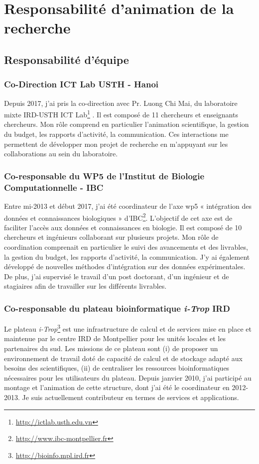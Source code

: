 \section{Responsabilité d'animation de la recherche}

\subsection*{Responsabilité d’équipe}
\subsubsection*{Co-Direction ICT Lab USTH - Hanoi} 
Depuis 2017, j’ai pris la co-direction avec Pr. Luong Chi Mai, du laboratoire mixte IRD-USTH ICT Lab\footnote{\url{http://ictlab.usth.edu.vn}} . Il est composé de 11 chercheurs et enseignants chercheurs. Mon rôle comprend en particulier l’animation scientifique, la gestion du budget, les rapports d’activité, la communication. Ces interactions me permettent de développer mon projet de recherche en m'appuyant sur les collaborations au sein du laboratoire.

\subsubsection*{Co-responsable du WP5 de l’Institut de Biologie Computationnelle - IBC} 
Entre mi-2013 et début 2017, j’ai été coordinateur de l’axe wp5 « intégration des données et connaissances biologiques » d'IBC\footnote{\url{http://www.ibc-montpellier.fr}}. L’objectif de cet axe est de faciliter l’accès aux données et connaissances en biologie. Il est composé de 10 chercheurs et ingénieurs collaborant sur plusieurs projets. Mon rôle de coordination comprenait en particulier le suivi des avancements et des livrables, la gestion du budget, les rapports d’activité, la communication. J’y ai également développé de nouvelles méthodes d’intégration sur des données expérimentales. De plus, j’ai supervisé le travail d’un post doctorant, d’un ingénieur et de stagiaires afin de travailler sur les différents livrables.  


\subsubsection*{Co-responsable du plateau bioinformatique \textit{i-Trop} IRD} 
Le plateau  \textit{i-Trop}\footnote{\url{http://bioinfo.mpl.ird.fr}} est une infrastructure de calcul et de services mise en place et maintenue par le centre IRD de Montpellier pour les unités locales et les partenaires du sud. Les missions de ce plateau sont (i) de proposer un environnement de travail doté de capacité de calcul et de stockage adapté aux besoins des scientifiques, (ii) de centraliser les ressources bioinformatiques nécessaires pour les utilisateurs du plateau. Depuis janvier 2010, j’ai participé au montage et l’animation de cette structure, dont j’ai été le coordinateur en 2012-2013. Je suis actuellement contributeur en termes de services et applications.


